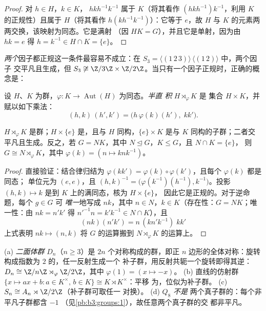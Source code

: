 \begin{proof}
对 $h \in H$，$k \in K$， $hkh^{-1}k^{-1}$ 属于
$K$（将其看作 $(hkh^{-1})k^{-1}$，利用 $K$ 的正规性）且属于
$H$（将其看作 $h(kh^{-1}k^{-1})$）：它等于 $e$，故 $H$ 与 $K$
的元素两两交换，该映射为同态。它是满射
（因 $HK = G$），并且它是单射，因为由 $hk = e$ 得 $h = k^{-1} \in
H \cap K = \{e\}$。
\end{proof}

\emph{两个}因子都正规这一条件最容易不成立：在 $S_3
= \langle (1\,2\,3)\rangle \,\langle(1\,2)\rangle$ 中，两个因子
交平凡且生成，但 $S_3 \not\cong \Z/3\Z \times
\Z/2\Z$。当只有一个因子正规时，正确的概念是：

\begin{definition}\label{def:b3:groups:semidirect}
设 $H$、$K$ 为群，$\varphi \colon K \to
\operatorname{Aut}(H)$ 为同态。\emph{半直
积} $H \rtimes_\varphi K$ 是
集合 $H \times K$，并赋以如下乘法：
\[
(h, k)\,(h', k') = \bigl(h\,\varphi(k)(h'),\; kk'\bigr).
\]
\end{definition}

\begin{proposition}\label{prop:b3:groups:semidirect}
$H \rtimes_\varphi K$ 是群；$H \times \{e\}$ 是，且与 $H$ 同构，$\{e\} \times K$ 是与
$K$ 同构的子群；二者交平凡且生成。反之，若 $G =
NK$，其中 $N \trianglelefteq G$，$K \leq G$，且 $N \cap K = \{e\}$，
则 $G \cong N \rtimes_\varphi K$，其中 $\varphi(k) = (n \mapsto
knk^{-1})$。
\end{proposition}

\begin{proof}
直接验证：结合律归结为 $\varphi(kk') =
\varphi(k)\circ\varphi(k')$，且每个 $\varphi(k)$ 都是同态；
单位元为 $(e,e)$，且 $(h,k)^{-1} =
\bigl(\varphi(k^{-1})(h^{-1}), k^{-1}\bigr)$。投影 $(h,k)
\mapsto k$ 是到 $K$ 上的满同态，核为 $H \times \{e\}$，
因此它是正规的。对于逆命题，每个 $g \in G$ 可
\emph{唯一}地写成 $nk$，其中 $n \in N$，$k \in K$（存在性：$G =
NK$；唯一性：由 $nk = n'k'$ 得 $n'^{-1}n = k'k^{-1} \in N \cap
K$），且
\[
(nk)(n'k') = n\,(kn'k^{-1})\;kk'
\]
上式表明 $nk \mapsto (n, k)$ 将 $G$ 的运算搬到
$N \rtimes_\varphi K$ 的运算上。
\end{proof}

\begin{example}\label{ex:b3:groups:semidirectexamples}
(a) \emph{二面体群} $D_n$（$n \geq
3$）是 $2n$ 个对称构成的群，即正 $n$ 边形的全体对称：旋转
构成指数为 $2$ 的，任一反射生成一个
补子群，用反射共轭一个旋转即得其逆：
$D_n \cong \Z/n\Z \rtimes_\varphi \Z/2\Z$，其中 $\varphi(1) = (x
\mapsto -x)$。
(b) 直线的仿射群 $\{x \mapsto ax + b : a \in
K^\times,\, b \in K\} \cong K \rtimes K^\times$：平移
为，位似为补子群。
(c) $S_n \cong A_n \rtimes \Z/2\Z$（补子群可取任一
对换）。
(d)  $Q_8$ \emph{不是}
两个真子群的：每个非平凡子群都含 $-1$
（见\cref{pb:b3:groups:1}），故任意两个真子群的交
都非平凡。
\end{example}


